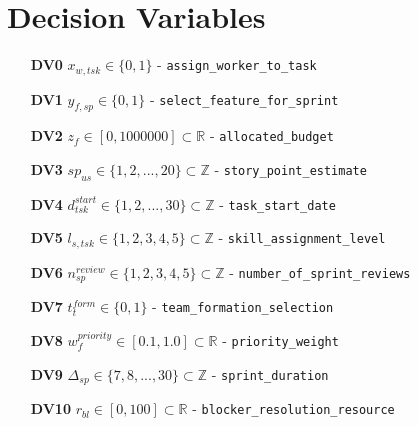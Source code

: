 \documentclass[11pt]{article}
\begin{document}
\section{Decision Variables}
\begin{itemize}
    \item[\textbf{DV0}] $x_{w, tsk} \in \{0, 1\}$ - \texttt{assign\_worker\_to\_task}
    \item[\textbf{DV1}] $y_{f, sp} \in \{0, 1\}$ - \texttt{select\_feature\_for\_sprint}
    \item[\textbf{DV2}] $z_f \in [0, 1000000] \subset \mathbb{R}$ - \texttt{allocated\_budget}
    \item[\textbf{DV3}] $sp_{us} \in \{1, 2, ..., 20\} \subset \mathbb{Z}$ - \texttt{story\_point\_estimate}
    \item[\textbf{DV4}] $d_{tsk}^{start} \in \{1, 2, ..., 30\} \subset \mathbb{Z}$ - \texttt{task\_start\_date}
    \item[\textbf{DV5}] $l_{s, tsk} \in \{1, 2, 3, 4, 5\} \subset \mathbb{Z}$ - \texttt{skill\_assignment\_level}
    \item[\textbf{DV6}] $n_{sp}^{review} \in \{1, 2, 3, 4, 5\} \subset \mathbb{Z}$ - \texttt{number\_of\_sprint\_reviews}
    \item[\textbf{DV7}] $t_{t}^{form} \in \{0, 1\}$ - \texttt{team\_formation\_selection}
    \item[\textbf{DV8}] $w_f^{priority} \in [0.1, 1.0] \subset \mathbb{R}$ - \texttt{priority\_weight}
    \item[\textbf{DV9}] $\Delta_{sp} \in \{7, 8, ..., 30\} \subset \mathbb{Z}$ - \texttt{sprint\_duration}
    \item[\textbf{DV10}] $r_{bl} \in [0, 100] \subset \mathbb{R}$ - \texttt{blocker\_resolution\_resource}
\end{itemize}
\end{document}
